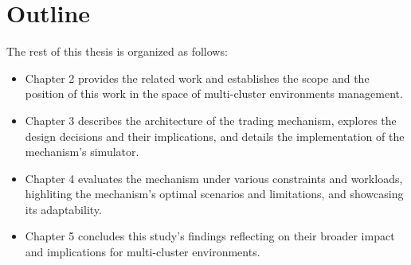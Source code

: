\section{Outline}
The rest of this thesis is organized as follows:
\begin{itemize}[noitemsep]
  
  \item Chapter 2 provides the related work and establishes the scope and the
    position of this work in the space of multi-cluster environments
    management.

  \item Chapter 3 describes the architecture of the trading mechanism, explores
    the design decisions and their implications, and details the implementation
    of the mechanism's simulator.  

  \item Chapter 4 evaluates the mechanism under various constraints and
    workloads, highliting the mechanism's optimal scenarios and limitations,
    and showcasing its adaptability.

  \item Chapter 5 concludes this study's findings reflecting on their broader
    impact and implications for multi-cluster environments.  

\end{itemize}
